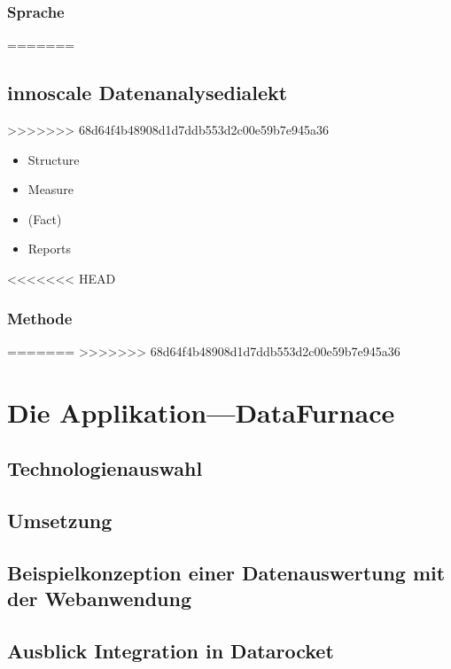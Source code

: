 \documentclass[
  language=german, %
  type=bachelor%
]{isthesis}
\begin{document}
\begin{content}
  \subsection{Sprache}
=======
  \section{innoscale Datenanalysedialekt}
>>>>>>> 68d64f4b48908d1d7ddb553d2c00e59b7e945a36
  \begin{itemize}
    \item Structure
    \item Measure
    \item (Fact)
    \item Reports
  \end{itemize}

<<<<<<< HEAD
  \subsection{Methode}

=======
>>>>>>> 68d64f4b48908d1d7ddb553d2c00e59b7e945a36


  \chapter{Die Applikation---DataFurnace}
  \section{Technologienauswahl}

  \section{Umsetzung}

  \section{Beispielkonzeption einer Datenauswertung mit der Webanwendung}

  \section{Ausblick Integration in Datarocket}

  

  

\end{content}
\end{document}
